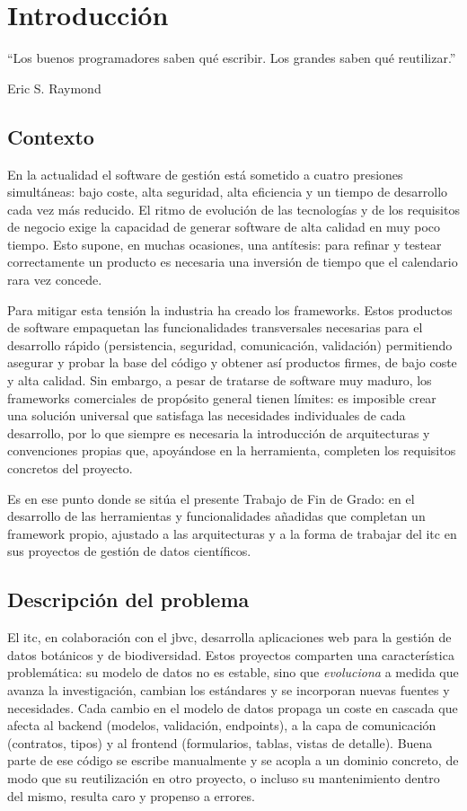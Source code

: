 \chapter{Introducción}
\epigraph{``Los buenos programadores saben qué escribir. Los grandes saben qué reutilizar.''}{Eric S. Raymond \cite{raymond1999cathedral}}

\section{Contexto}
En la actualidad el software de gestión está sometido a cuatro presiones
simultáneas: bajo coste, alta seguridad, alta eficiencia y un tiempo de
desarrollo cada vez más reducido. El ritmo de evolución de las tecnologías y
de los requisitos de negocio exige la capacidad de generar software de alta
calidad en muy poco tiempo. Esto supone, en muchas ocasiones, una antítesis:
para refinar y \gls{testear} correctamente un producto es necesaria una
inversión de tiempo que el calendario rara vez concede.

Para mitigar esta tensión la industria ha creado los \gls{framework}s. Estos
productos de software empaquetan las funcionalidades transversales necesarias
para el desarrollo rápido (persistencia, seguridad, comunicación, validación) 
permitiendo asegurar y probar la base del código y obtener así productos
firmes, de bajo coste y alta calidad. Sin embargo, a pesar de tratarse de
software muy maduro, los frameworks comerciales de propósito general tienen
límites: es imposible crear una solución universal que satisfaga las
necesidades individuales de cada desarrollo, por lo que siempre es necesaria
la introducción de arquitecturas y convenciones propias que, apoyándose en la
herramienta, completen los requisitos concretos del proyecto.

Es en ese punto donde se sitúa el presente Trabajo de Fin de Grado: en el
desarrollo de las herramientas y funcionalidades añadidas que completan un
framework propio, ajustado a las arquitecturas y a la forma de trabajar del
\gls{itc} en sus proyectos de gestión de datos científicos.

\section{Descripción del problema}
El \gls{itc}, en colaboración con el \gls{jbvc}, desarrolla aplicaciones web
para la gestión de datos botánicos y de biodiversidad. Estos proyectos
comparten una característica problemática: su modelo de datos no es estable,
sino que \emph{evoluciona} a medida que avanza la investigación, cambian los estándares 
y se incorporan nuevas fuentes y necesidades. Cada cambio en el modelo de datos propaga un
coste en cascada que afecta al backend (modelos, validación, endpoints), a la
capa de comunicación (contratos, tipos) y al frontend (formularios, tablas,
vistas de detalle). Buena parte de ese código se escribe manualmente y se
acopla a un dominio concreto, de modo que su reutilización en otro proyecto, o
incluso su mantenimiento dentro del mismo, resulta caro y propenso a errores.

